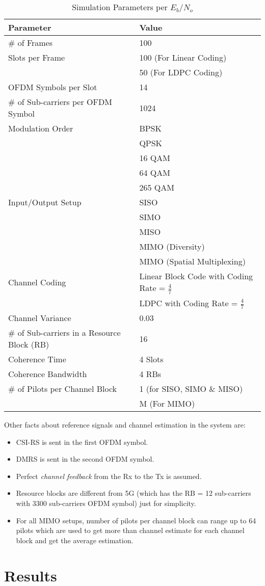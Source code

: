 \begin{table}[ht]
    \centering
    \caption{Simulation Parameters per $E_b$/$N_o$}
    \label{tbl:ch parameters}
    \begin{tabular}{ll}
        \toprule
        Parameter & Value \\
        \midrule
        \# of Frames & 100 \\
        Slots per Frame & 100 (For Linear Coding) \\
                        & 50 (For LDPC Coding) \\
        OFDM Symbols per Slot & 14 \\
        \# of Sub-carriers per OFDM Symbol & 1024 \\
        Modulation Order & BPSK \\
                         & QPSK \\
                         & 16 QAM \\
                         & 64 QAM \\
                         & 265 QAM \\
        Input/Output Setup & SISO \\
                           & SIMO \\
                           & MISO \\
                           & MIMO (Diversity) \\
                           & MIMO (Spatial Multiplexing) \\
        Channel Coding & Linear Block Code with Coding Rate = $\frac{4}{7}$ \\
                       & LDPC with Coding Rate = $\frac{4}{7}$ \\
        Channel Variance & 0.03 \\
        \# of Sub-carriers in a Resource Block (RB) & 16 \\
        Coherence Time & 4 Slots \\
        Coherence Bandwidth & 4 RBs \\ 
        \# of Pilots per Channel Block & 1 (for SISO, SIMO \& MISO) \\
        & M (For MIMO) \\
        \bottomrule
    \end{tabular}
\end{table}

Other facts about reference signals and channel estimation in the system are:
\begin{itemize}
    \item CSI-RS is sent in the first OFDM symbol.
    \item DMRS is sent in the second OFDM symbol.
    \item Perfect \emph{channel feedback} from the Rx to the Tx is assumed.
    \item Resource blocks are different from 5G (which has the RB = 12 sub-carriers with 3300 sub-carriers OFDM symbol) just for simplicity.
    \item For all MIMO setups, number of pilots per channel block can range up to 64 pilots which are used to get more than channel estimate for each channel block and get the average estimation.
\end{itemize}

\section{Results}